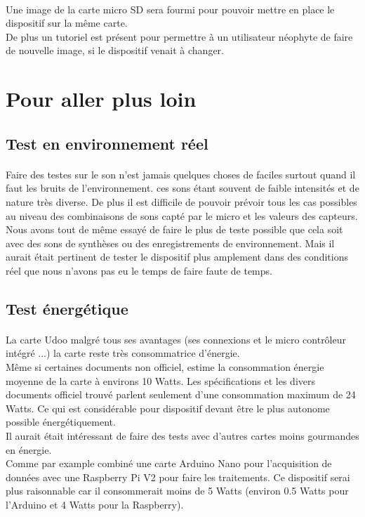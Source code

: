 \documentclass[a4paper, titlepage, oneside, 12pt]{article}%
\begin{document}
\paragraph{}
Une image de la carte micro SD sera fourmi pour pouvoir mettre en place le dispositif sur la même carte.\\
De plus un tutoriel est présent pour  permettre à un utilisateur néophyte de faire de nouvelle image, si le dispositif venait à changer.

\section{Pour aller plus loin}
\subsection{Test en environnement réel}
\paragraph{}
Faire des testes sur le son n'est jamais quelques choses de faciles surtout quand il faut les bruits de l'environnement. ces sons étant souvent de faible intensités et de nature très diverse. De plus il est difficile de pouvoir prévoir tous les cas possibles au niveau des combinaisons de sons capté par le micro et les valeurs des capteurs.\\
Nous avons tout de même essayé de faire le plus de teste possible que cela soit avec des sons de synthèses ou des enregistrements de environnement. Mais il aurait était pertinent de tester le dispositif plus amplement dans des conditions réel que nous n'avons pas eu le temps de faire faute de temps. 

\subsection{Test énergétique}
\paragraph{}
La carte Udoo malgré tous ses avantages (ses connexions et le micro contrôleur intégré ...) la carte reste très consommatrice d’énergie.\\
Même si certaines documents non officiel, estime la consommation énergie moyenne de la carte à environs 10 Watts. Les spécifications et les divers documents officiel trouvé parlent seulement d'une consommation maximum de 24 Watts. Ce qui est considérable pour dispositif devant être le plus autonome possible énergétiquement.\\
Il aurait était intéressant de faire des tests avec d'autres cartes moins gourmandes en énergie.\\
Comme par example combiné une carte Arduino Nano pour l’acquisition de données avec une Raspberry Pi V2 pour faire les traitements. Ce dispositif serai plus raisonnable car il consommerait moins de 5 Watts (environ  0.5 Watts pour l'Arduino et 4 Watts pour la Raspberry).\\
\end{document}
